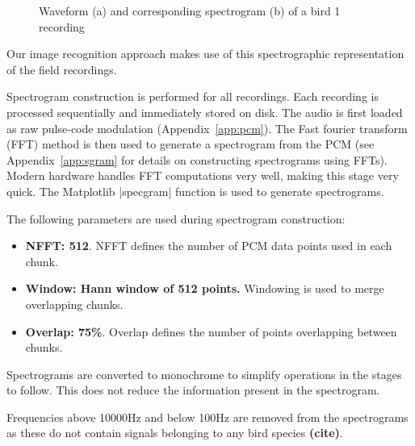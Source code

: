 \begin{figure}[!htb]
  \centering
  \begin{subfigure}[b]{1.0\textwidth}
    \caption{}
  \end{subfigure}
  \begin{subfigure}[b]{1.0\textwidth}
    \caption{}
  \end{subfigure}
  \caption{Waveform (a) and corresponding spectrogram (b) of a bird 1 recording}
  \label{fig:sgram_pcm}
\end{figure}

Our image recognition approach makes use of this spectrographic representation
of the field recordings.

Spectrogram construction is performed for all recordings.
Each recording is processed sequentially and immediately stored on disk.
The audio is first loaded as raw pulse-code modulation (Appendix~\ref{app:pcm}).
The Fast fourier transform (FFT) method is then used to generate a spectrogram
from the PCM (see Appendix~\ref{app:sgram} for details on constructing
spectrograms using FFTs).
Modern hardware handles FFT computations very well, making this stage very quick.
The Matplotlib |specgram| function is used to generate spectrograms.

The following parameters are used during spectrogram construction:
\begin{itemize}[noitemsep]
  \item \textbf{NFFT: 512}.
    NFFT defines the number of PCM data points used in each chunk.
  \item \textbf{Window: Hann window of 512 points.}
    Windowing is used to merge overlapping chunks.
  \item \textbf{Overlap: 75\%}.
    Overlap defines the number of points overlapping between chunks.
\end{itemize}

Spectrograms are converted to monochrome to simplify operations in the stages
to follow.
This does not reduce the information present in the spectrogram.

Frequencies above 10000Hz and below 100Hz are removed from the spectrograms as
these do not contain signals belonging to any bird species \textbf{(cite)}.
